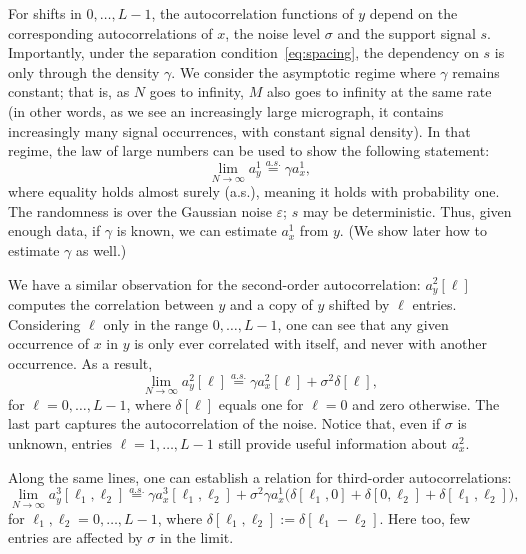 \documentclass[12pt]{article}
\newcommand{\1}{\mathbf{1}}
\newcommand{\aseq}{\stackrel{a.s.}{=}}
\theoremstyle{plain}
\theoremstyle{definition}
\theoremstyle{remark}
\theoremstyle{plain}
\theoremstyle{remark}
\theoremstyle{plain}
\theoremstyle{plain}
\begin{document}
For shifts in $0, \ldots, L-1$, the autocorrelation functions of $y$ depend on the corresponding autocorrelations of $x$, the noise level $\sigma$ and the support signal $s$. Importantly, under the separation condition~\eqref{eq:spacing}, the dependency on $s$ is only through the density $\gamma$.
We consider the asymptotic regime where $\gamma$ remains constant; that is, as $N$ goes to infinity, $M$ also goes to infinity at the same rate (in other words, as we see an increasingly large micrograph, it contains increasingly many signal occurrences, with constant signal density). In that regime, the law of large numbers can be used to show the following statement:
\begin{equation} \label{eq:mean_micrograph}
\lim_{N\to\infty} a_y^1  \aseq \gamma a_{x}^1,
\end{equation}
where equality holds almost surely (a.s.), meaning it holds with probability one.
The randomness is over the Gaussian noise $\varepsilon$; $s$ may be deterministic.
Thus, given enough data, if $\gamma$ is known, we can estimate $a_x^1$ from $y$. (We show later how to estimate $\gamma$ as well.) 

We have a similar observation for the second-order autocorrelation: $a_y^2[\ell]$ computes the correlation between $y$ and a copy of $y$ shifted by $\ell$ entries. Considering $\ell$ only in the range $0, \ldots, L-1$, one can see that any given occurrence of $x$ in $y$ is only ever correlated with itself, and never with another occurrence. As a result,
\begin{equation}
\lim_{N\to\infty} a_y^2[\ell]  \aseq \gamma a_{x}^2[\ell] + \sigma^2\delta[\ell],
\label{eq:ac2_micrograph}
\end{equation}
for $\ell = 0, \ldots, L-1$, where $\delta[\ell]$ equals one for $\ell=0$ and zero otherwise. The last part captures the autocorrelation of the noise. Notice that, even if $\sigma$ is unknown, entries $\ell = 1, \ldots, L-1$ still provide useful information about $a_x^2$.

Along the same lines, one can establish a relation for third-order autocorrelations:
\begin{equation}
 \label{eq:ac3_micrograph}
\lim_{N\to\infty} a_y^3[\ell_1,\ell_2] \aseq \gamma a_{x}^3[\ell_1,\ell_2]  + \sigma^2\gamma a_{x}^1  \big(\delta[\ell_1,0]+\delta[0,\ell_2]
+\delta[\ell_1,\ell_2]\big),
\end{equation}
for $\ell_1,\ell_2 = 0, \ldots, L-1$, where $\delta[\ell_1,\ell_2]:=\delta[\ell_1-\ell_2]$.
Here too, few entries are affected by $\sigma$ in the limit.
\end{document}
